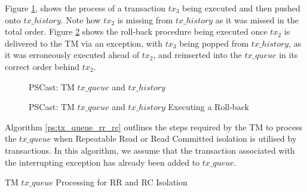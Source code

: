     Figure \ref{fig:tx_queue_history}, shows the process of a transaction $tx_3$ being executed and then pushed onto $tx\_history$.  Note how $tx_2$ is missing from $tx\_history$ as it was missed in the total order.  Figure \ref{fig:tx_queue_history_rollback} shows the roll-back procedure being executed once $tx_2$ is delivered to the TM via an exception, with $tx_3$ being popped from $tx\_history$, as it was erroneously executed ahead of $tx_2$, and reinserted into the $tx\_queue$ in its correct order behind $tx_2$.  
    
    \begin{figure}[h] 
        \centering
         \caption[PSCast: TM $tx\_queue$ and $tx\_history$]{PSCast: TM $tx\_queue$ and $tx\_history$}
         \label{fig:tx_queue_history}
    \end{figure}      
    
    \begin{figure}[h] 
        \centering
         \caption[PSCast: TM $tx\_queue$ and $tx\_history$ Executing a Roll-back]{PSCast: TM $tx\_queue$ and $tx\_history$ Executing a Roll-back}
         \label{fig:tx_queue_history_rollback}
    \end{figure}  
    
    Algorithm \ref{ps:tx_queue_rr_rc} outlines the steps required by the TM to process the $tx\_queue$ when Repeatable Read or Read Committed isolation is utilised by transactions.  In this algorithm, we assume that the transaction associated with the interrupting exception has already been added to $tx\_queue$.  
    
    \begin{algorithm}[h]
        \caption{TM $tx\_queue$ Processing for RR and RC Isolation}
        \label{ps:tx_queue_rr_rc}
        \begin{algorithmic}[1]
                
                \ENDWHILE
                             
                \ENDIF
                
                \ENDIF
                
            \ENDWHILE
        \end{algorithmic}%
    \end{algorithm}
    
